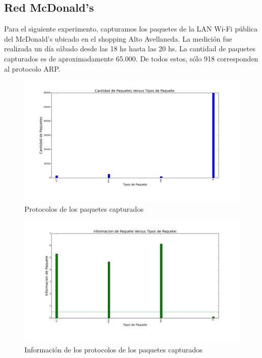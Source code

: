 \subsection{Red McDonald's}

Para el siguiente experimento, capturamos los paquetes de la LAN Wi-Fi pública del McDonald's ubicado en el shopping Alto Avellaneda. La medición fue realizada un día sábado desde las 18 hs hasta las 20 hs. La cantidad de paquetes capturados es de aproximadamente 65.000. De todos estos, sólo 918 corresponden al protocolo ARP.

\begin{figure}[H]
       \centering
       \includegraphics[width=1\textwidth]{../resultados/McDonalds/histogram_types.png}
       \caption{Protocolos de los paquetes capturados}
       \label{red-hogarena-types}
\end{figure}

\begin{figure}[H]
       \centering
       \includegraphics[width=1\textwidth]{../resultados/McDonalds/histogram_types_information.png}
       \caption{Información de los protocolos de los paquetes capturados}
       \label{red-hogarena-types}
\end{figure}

